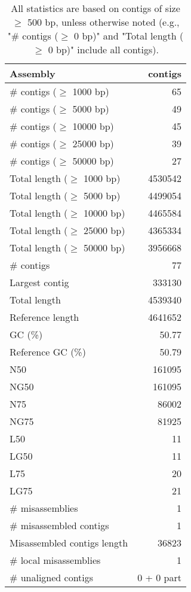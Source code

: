 \documentclass[12pt,a4paper]{article}
\begin{document}
\begin{table}[ht]
\begin{center}
\caption{All statistics are based on contigs of size $\geq$ 500 bp, unless otherwise noted (e.g., "\# contigs ($\geq$ 0 bp)" and "Total length ($\geq$ 0 bp)" include all contigs).}
\begin{tabular}{|l*{1}{|r}|}
\hline
Assembly & contigs \\ \hline
\# contigs ($\geq$ 1000 bp) & 65 \\ \hline
\# contigs ($\geq$ 5000 bp) & 49 \\ \hline
\# contigs ($\geq$ 10000 bp) & 45 \\ \hline
\# contigs ($\geq$ 25000 bp) & 39 \\ \hline
\# contigs ($\geq$ 50000 bp) & 27 \\ \hline
Total length ($\geq$ 1000 bp) & 4530542 \\ \hline
Total length ($\geq$ 5000 bp) & 4499054 \\ \hline
Total length ($\geq$ 10000 bp) & 4465584 \\ \hline
Total length ($\geq$ 25000 bp) & 4365334 \\ \hline
Total length ($\geq$ 50000 bp) & 3956668 \\ \hline
\# contigs & 77 \\ \hline
Largest contig & 333130 \\ \hline
Total length & 4539340 \\ \hline
Reference length & 4641652 \\ \hline
GC (\%) & 50.77 \\ \hline
Reference GC (\%) & 50.79 \\ \hline
N50 & 161095 \\ \hline
NG50 & 161095 \\ \hline
N75 & 86002 \\ \hline
NG75 & 81925 \\ \hline
L50 & 11 \\ \hline
LG50 & 11 \\ \hline
L75 & 20 \\ \hline
LG75 & 21 \\ \hline
\# misassemblies & 1 \\ \hline
\# misassembled contigs & 1 \\ \hline
Misassembled contigs length & 36823 \\ \hline
\# local misassemblies & 1 \\ \hline
\# unaligned contigs & 0 + 0 part \\ \hline

\end{tabular}
\end{center}
\end{table}
\end{document}
